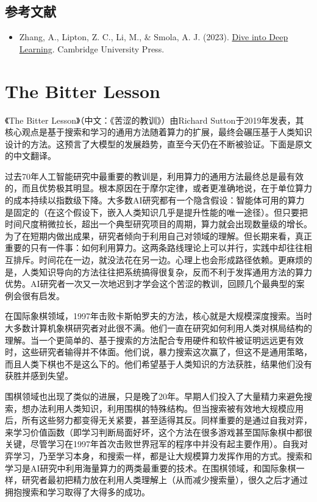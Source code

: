 \hypertarget{ux53c2ux8003ux6587ux732e-4}{%
\subsection{参考文献}\label{ux53c2ux8003ux6587ux732e-4}}

\vspace{0.25em}
\begin{itemize}
\tightlist
\item
  Zhang, A., Lipton, Z. C., Li, M., \& Smola, A. J. (2023). \href{https://D2L.ai}{Dive into Deep Learning}. Cambridge University Press.
\end{itemize}

\clearpage

\hypertarget{the-bitter-lesson}{%
\section{The Bitter Lesson}\label{the-bitter-lesson}}

《The Bitter Lesson》（中文：《苦涩的教训》）由Richard Sutton于2019年发表，其核心观点是基于搜索和学习的通用方法随着算力的扩展，最终会碾压基于人类知识设计的方法。这预言了大模型的发展趋势，直至今天仍在不断被验证。下面是原文的中文翻译。

过去70年人工智能研究中最重要的教训是，利用算力的通用方法最终总是最有效的，而且优势极其明显。根本原因在于摩尔定律，或者更准确地说，在于单位算力的成本持续以指数级下降。大多数AI研究都有一个隐含假设：智能体可用的算力是固定的（在这个假设下，嵌入人类知识几乎是提升性能的唯一途径）。但只要把时间尺度稍微拉长，超出一个典型研究项目的周期，算力就会出现数量级的增长。为了在短期内做出成果，研究者倾向于利用自己对领域的理解。但长期来看，真正重要的只有一件事：如何利用算力。这两条路线理论上可以并行，实践中却往往相互排斥。时间花在一边，就没法花在另一边。心理上也会形成路径依赖。更麻烦的是，人类知识导向的方法往往把系统搞得很复杂，反而不利于发挥通用方法的算力优势。AI研究者一次又一次地迟到才学会这个苦涩的教训，回顾几个最典型的案例会很有启发。

在国际象棋领域，1997年击败卡斯帕罗夫的方法，核心就是大规模深度搜索。当时大多数计算机象棋研究者对此很不满。他们一直在研究如何利用人类对棋局结构的理解。当一个更简单的、基于搜索的方法配合专用硬件和软件被证明远远更有效时，这些研究者输得并不体面。他们说，暴力搜索这次赢了，但这不是通用策略，而且人类下棋也不是这么下的。他们希望基于人类知识的方法获胜，结果他们没有获胜并感到失望。

围棋领域也出现了类似的进展，只是晚了20年。早期人们投入了大量精力来避免搜索，想办法利用人类知识，利用围棋的特殊结构。但当搜索被有效地大规模应用后，所有这些努力都变得无关紧要，甚至适得其反。同样重要的是通过自我对弈，来学习价值函数（即学习判断局面好坏，这个方法在很多游戏甚至国际象棋中都很关键，尽管学习在1997年首次击败世界冠军的程序中并没有起主要作用）。自我对弈学习，乃至学习本身，和搜索一样，都是让大规模算力发挥作用的方式。搜索和学习是AI研究中利用海量算力的两类最重要的技术。在围棋领域，和国际象棋一样，研究者最初把精力放在利用人类理解上（从而减少搜索量），很久之后才通过拥抱搜索和学习取得了大得多的成功。

